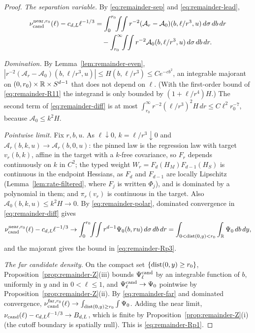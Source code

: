 \begin{proof}
\emph{The separation variable.} By \eqref{eq:remainder-sep} and \eqref{eq:remainder-lead},
\begin{equation}\label{eq:remainder-diff}
\begin{aligned}
\nu_{\cand}^{\mathrm{near},r_0}(\ell)-c_{d,L}\ell^{-1/3}&=\int_0^{r_0}\!\!\int\!\!\int r^{-2}(\mathcal A_r-\mathcal A_0)(b,\ell/r^3,u)\,d\sigma\,db\,dr\\
&\quad-\int_{r_0}^\infty\!\!\int\!\!\int r^{-2}\mathcal A_0(b,\ell/r^3,u)\,d\sigma\,db\,dr .
\end{aligned}
\end{equation}

\emph{Domination.} By Lemma~\ref{lem:remainder-even}, $|r^{-2}(\mathcal A_r-\mathcal A_0)(b,\ell/r^3,u)|\le H(b,\ell/r^3)\le Ce^{-cb^2}$, an integrable majorant on $(0,r_0)\times\mathbb R\times S^{d-1}$ that does not depend on $\ell$. (With the first-order bound of \eqref{eq:remainder-R11} the integrand is only bounded by $(1+\ell/r^4)H$.) The second term of \eqref{eq:remainder-diff} is at most $\int_{r_0}^\infty r^{-2}(\ell/r^3)^2H\,dr\le C\ell^2r_0^{-7}$, because $\mathcal A_0\le k^2H$.

\emph{Pointwise limit.} Fix $r,b,u$. As $\ell\downarrow0$, $k=\ell/r^3\downarrow0$ and $\mathcal A_r(b,k,u)\to\mathcal A_r(b,0,u)$: the pinned law is the regression law with target $v_r(b,k)$, affine in the target with a $k$-free covariance, so $F_r$ depends continuously on $k$ in $C^2$; the typed weight $W_r=F_d(H_M)F_{d-1}(H_S)$ is continuous in the endpoint Hessians, as $F_d$ and $F_{d-1}$ are locally Lipschitz (Lemma~\ref{lem:rate-filtered}, where $F_j$ is written $\Phi_j$), and is dominated by a polynomial in them; and $\pi_r(v_r)$ is continuous in the target. Also $\mathcal A_0(b,k,u)\le k^2H\to0$. By \eqref{eq:remainder-polar}, dominated convergence in \eqref{eq:remainder-diff} gives
\[
\nu_{\mathrm{cand}}^{\mathrm{near},r_0}(\ell)-c_{d,L}\ell^{-1/3}\to\int_0^{r_0}\!\!\int\!\!\int r^{d-1}\Psi_0(b,ru)\,d\sigma\,db\,dr=\int_{0<\operatorname{dist}(0,y)<r_0}\int_\mathbb R\Psi_0\,db\,dy,
\]
and the majorant gives the bound in \eqref{eq:remainder-Rp3}.

\emph{The far candidate density.} On the compact set $\{\operatorname{dist}(0,y)\ge r_0\}$, Proposition~\ref{prop:remainder-Z}(iii) bounds $\Psi^{\mathrm{cand}}_\ell$ by an integrable function of $b$, uniformly in $y$ and in $0<\ell\le1$, and $\Psi^{\mathrm{cand}}_\ell\to\Psi_0$ pointwise by Proposition~\ref{prop:remainder-Z}(ii). By \eqref{eq:remainder-far} and dominated convergence, $\nu_{\mathrm{cand}}^{\mathrm{far},r_0}(\ell)\to\int_{\operatorname{dist}(0,y)\ge r_0}\int\Psi_0$. Adding the near limit, $\nu_{\mathrm{cand}}(\ell)-c_{d,L}\ell^{-1/3}\to B_{d,L}$, which is finite by Proposition~\ref{prop:remainder-Z}(i) (the cutoff boundary is spatially null). This is \eqref{eq:remainder-Rp1}.


\end{proof}
